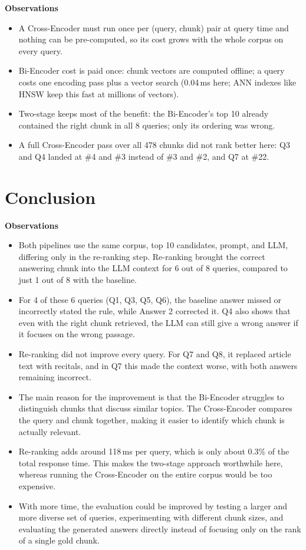 \documentclass[11pt,a4paper]{article}
\newenvironment{observations}
  {\par\smallskip\noindent\textbf{Observations}\begin{itemize}}
  {\end{itemize}\smallskip}
\begin{document}
\begin{observations}
  \item A Cross-Encoder must run once per (query, chunk) pair at query time and nothing can be
        pre-computed, so its cost grows with the whole corpus on every query.
  \item Bi-Encoder cost is paid once: chunk vectors are computed offline; a query costs one encoding pass plus
        a vector search (0.04\,ms here; ANN indexes like HNSW keep this fast at millions of vectors).
  \item Two-stage keeps most of the benefit: the Bi-Encoder's top 10 already contained the right chunk in all
        8 queries; only its ordering was wrong.
  \item A full Cross-Encoder pass over all 478 chunks did not rank better here: Q3 and Q4 landed at \#4 and
        \#3 instead of \#3 and \#2, and Q7 at \#22.
\end{observations}

\section*{Conclusion}

\begin{observations}
  \item Both pipelines use the same corpus, top 10 candidates, prompt, and LLM, differing only in the re-ranking step. Re-ranking brought the correct answering chunk into the LLM context for 6 out of 8 queries, compared to just 1 out of 8 with the baseline.
  \item For 4 of these 6 queries (Q1, Q3, Q5, Q6), the baseline answer missed or incorrectly stated the rule, while Answer 2 corrected it. Q4 also shows that even with the right chunk retrieved, the LLM can still give a wrong answer if it focuses on the wrong passage.
  \item Re-ranking did not improve every query. For Q7 and Q8, it replaced article text with recitals, and in Q7 this made the context worse, with both answers remaining incorrect.
  \item The main reason for the improvement is that the Bi-Encoder struggles to distinguish chunks that discuss similar topics. The Cross-Encoder compares the query and chunk together, making it easier to identify which chunk is actually relevant.
  \item Re-ranking adds around 118\,ms per query, which is only about 0.3\% of the total response time. This makes the two-stage approach worthwhile here, whereas running the Cross-Encoder on the entire corpus would be too expensive.
  \item With more time, the evaluation could be improved by testing a larger and more diverse set of queries, experimenting with different chunk sizes, and evaluating the generated answers directly instead of focusing only on the rank of a single gold chunk.
\end{observations}
\end{document}
